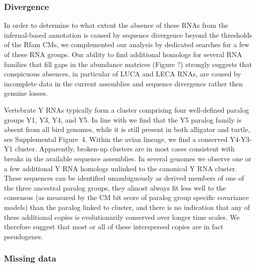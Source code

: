 \documentclass[10pt]{bmc_article}
\newenvironment{bmcformat}{\begin{raggedright}\baselineskip20pt\sloppy\setboolean{publ}{false}}{\end{raggedright}\baselineskip20pt\sloppy}
\begin{document}
\begin{bmcformat}
\subsubsection*{Divergence}

In order to determine to what extent the absence of these RNAs from
the infernal-based annotation is caused by sequence divergence beyond
the thresholds of the Rfam CMs, we complemented our analysis by
dedicated searches for a few of these RNA groups. Our ability to find
additional homologs for several RNA families that fill gaps in the
abundance matrices (Figure ?) strongly suggests that conspicuous
absences, in particular of LUCA and LECA RNAs, are caused by
incomplete data in the current assemblies and sequence divergence
rather then genuine losses.

Vertebrate Y RNAs typically form a cluster comprising four
well-defined paralog groups Y1, Y3, Y4, and Y5. In line with
\cite{Mosig:07a} we find that the Y5 paralog family is absent from all
bird genomes, while it is still present in both alligator and turtle,
see Supplemental Figure~4. Within the avian lineage, we find a
conserved Y4-Y3-Y1 cluster. Apparently, broken-up clusters are in most
cases consistent with breaks in the available sequence assemblies.  In
several genomes we observe one or a few additional Y RNA homologs
unlinked to the canonical Y RNA cluster. These sequences can be
identified unambiguously as derived members of one of the three
ancestral paralog groups, they almost always fit less well to the
consensus (as measured by the CM bit score of paralog group specific
covariance models) than the paralog linked to cluster, and there is no
indication that any of these additional copies is evolutionarily
conserved over longer time scales. We therefore suggest that most or
all of these interspersed copies are in fact pseudogenes.

\subsubsection*{Missing data}


\end{bmcformat}
\end{document}
